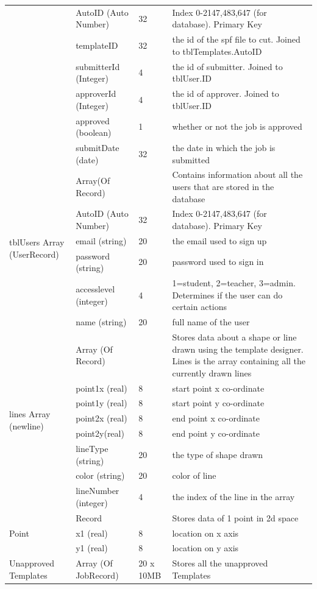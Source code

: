 \documentclass[oneside,openany,11pt,a4paper]{report}
\begin{document}
\begin{longtable}{|p{2cm}|p{4cm}|p{2cm}|p{6cm}|}
		& Auto\textunderscore ID (Auto Number) & 32 & Index 0-2147,483,647 (for database). Primary Key  \\
		& template\textunderscore ID & 32 & the id of the spf file to cut. Joined to tblTemplates.Auto\textunderscore ID \\
		& submitterId (Integer) & 4 & the id of submitter. Joined to tblUser.\textunderscore ID \\
		& approverId (Integer) & 4 & the id of approver. Joined to tblUser.\textunderscore ID \\
		& approved (boolean) & 1 & whether or not the job is approved \\
		& submitDate (date) & 32 & the date in which the job is submitted\\
		\hline
		
			\multirow{6}{*}{\parbox{2cm}{tblUsers Array (UserRecord)} }
		& Array(Of Record) &   &   Contains information about all the users that are stored in the database \\ 
		
		& Auto\textunderscore ID (Auto Number) & 32 & Index 0-2147,483,647 (for database). Primary Key  \\
		& email (string) & 20 & the email used to sign up \\
		& password (string) & 20 & password used to sign in\\
		& accesslevel (integer) & 4 & 1=student, 2=teacher, 3=admin. Determines if the user can do certain actions \\
		& name (string) & 20 & full name of the user \\
		\hline

		\multirow{8}{*}{\parbox{2cm}{lines Array (newline)}}
		& Array (Of Record) & & Stores data about a shape or line drawn using the template designer. Lines is the array containing all the currently drawn lines \\
		& point1x (real) & 8 &start point x co-ordinate \\
			& point1y (real) & 8 &start point y co-ordinate \\
				& point2x (real) & 8 &end point x co-ordinate \\
					& point2y(real) & 8 &end point y co-ordinate \\
						& lineType (string) & 20 & the type of shape drawn\\
						& color (string) & 20 & color of line\\
						& lineNumber (integer) & 4 & the index of the line in the array\\\hline
		\multirow{3}{*}{\parbox{2cm}{Point}}
		& Record & & Stores data of 1 point in 2d space \\
		& x1 (real) & 8 & location on x axis \\
		& y1 (real) & 8 & location on y axis \\
		\hline
		
		Unapproved Templates
		& Array (Of JobRecord) & 20 x 10MB & Stores all the unapproved Templates
		\\ \hline
	
\end{longtable}
\end{document}
